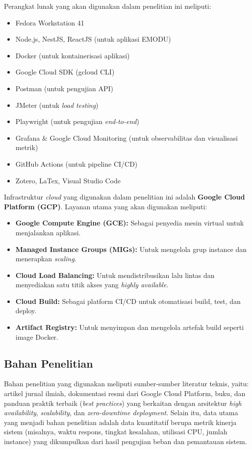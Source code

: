 \hspace{-32pt} Perangkat lunak yang akan digunakan dalam penelitian ini meliputi:
\begin{itemize}
  \item Fedora Workstation 41
  \item Node.js, NestJS, ReactJS (untuk aplikasi EMODU)
  \item Docker (untuk kontainerisasi aplikasi)
  \item Google Cloud SDK (gcloud CLI)
  \item Postman (untuk pengujian API)
  \item JMeter (untuk \textit{load testing})
  \item Playwright (untuk pengujian \textit{end-to-end})
  \item Grafana \& Google Cloud Monitoring (untuk observabilitas dan visualisasi metrik)
  \item GitHub Actions (untuk pipeline CI/CD)
  \item Zotero, LaTex, Visual Studio Code
\end{itemize}

\hspace{-32pt} Infrastruktur \textit{cloud} yang digunakan dalam penelitian ini adalah \textbf{Google Cloud Platform (GCP)}. Layanan utama yang akan digunakan meliputi:
\begin{itemize}
  \item \textbf{Google Compute Engine (GCE):} Sebagai penyedia mesin virtual untuk menjalankan aplikasi.
  \item \textbf{Managed Instance Groups (MIGs):} Untuk mengelola grup instance dan menerapkan \textit{scaling}.
  \item \textbf{Cloud Load Balancing:} Untuk mendistribusikan lalu lintas dan menyediakan satu titik akses yang \textit{highly available}.
  \item \textbf{Cloud Build:} Sebagai platform CI/CD untuk otomatisasi build, test, dan deploy.
  \item \textbf{Artifact Registry:} Untuk menyimpan dan mengelola artefak build seperti image Docker.
\end{itemize}

\subsection{Bahan Penelitian}
Bahan penelitian yang digunakan meliputi sumber-sumber literatur teknis, yaitu: artikel jurnal ilmiah, dokumentasi resmi dari Google Cloud Platform, buku, dan panduan praktik terbaik (\textit{best practices}) yang berkaitan dengan arsitektur \textit{high availability}, \textit{scalability}, dan \textit{zero-downtime deployment}.
Selain itu, data utama yang menjadi bahan penelitian adalah data kuantitatif berupa metrik kinerja sistem (misalnya, waktu respons, tingkat kesalahan, utilisasi CPU, jumlah instance) yang dikumpulkan dari hasil pengujian beban dan pemantauan sistem.

